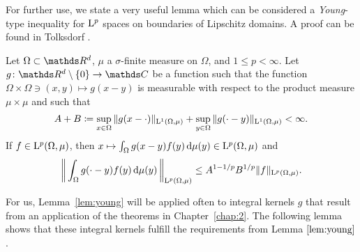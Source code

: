 
For further use, we state a very useful lemma which can be considered a \emph{Young}-type inequality for $\mathrm{L}^p$ spaces on boundaries of Lipschitz domains.
A proof can be found in Tolksdorf \cite[Prop.\@~1.1.4]{tolksdorf}.

\begin{lem}
  \label{lem:young}
  Let $\Omega \subset \R^d$, $\mu$ a $\sigma$-finite measure on $\Omega$, and $1 \leq p < \infty$.
  Let $g \colon \R^d \setminus \{ 0\} \to \C$ be a function such that the function $\Omega \times \Omega \ni (x, y) \mapsto g(x-y)$ is measurable with respect to the product measure $\mu \times \mu$ and such that
  \begin{align*}
    A + B \coloneqq \sup_{x \in \Omega} \| g(x - \cdot) \|_{\mathrm{L}^1(\Omega, \mu)} + \sup_{y \in \Omega} \|g(\cdot - y) \|_{\mathrm{L}^1(\Omega, \mu)} < \infty.
  \end{align*}
  If $f \in \mathrm{L}^p(\Omega, \mu)$, then $x \mapsto \int_\Omega g(x - y) f(y) \, {\operatorname{d}\!{\mu}}(y) \in \mathrm{L}^p(\Omega, \mu)$ and
  \begin{align*}
    \bigg\| \int_\Omega g(\cdot - y) f(y) \, {\operatorname{d}\!{\mu}}(y)\, \bigg\|_{\mathrm{L}^p(\Omega, \mu)} \leq A^{1 - 1/p} B^{1/p} \|f\|_{\mathrm{L}^p(\Omega, \mu)}.
  \end{align*}
\end{lem}

For us, Lemma~\ref{lem:young} will be applied often to integral kernels $g$ that result from an application of the theorems in Chapter~\ref{chap:2}.
The following lemma shows that these integral kernels fulfill the requirements from Lemma $\ref{lem:young}$.

